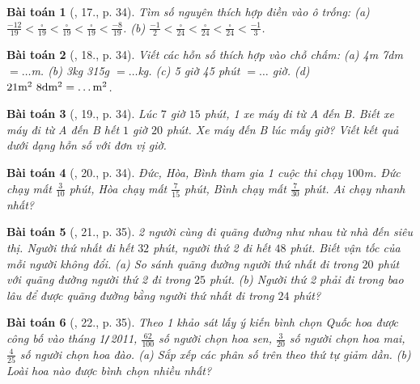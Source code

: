 \documentclass{article}
\newtheorem{baitoan}{Bài toán}
\begin{document}
\begin{baitoan}[\cite{SBT_Toan_6_Canh_Dieu_tap_2}, 17., p. 34]
	Tìm số nguyên thích hợp điền vào ô trống: (a) $\frac{-12}{19} < \frac{\square}{19} < \frac{\square}{19} < \frac{\square}{19} < \frac{-8}{19}$. (b) $\frac{-1}{2} < \frac{\square}{24} < \frac{\square}{24} < \frac{\square}{24} < \frac{-1}{3}$.
\end{baitoan}

\begin{baitoan}[\cite{SBT_Toan_6_Canh_Dieu_tap_2}, 18., p. 34]
	Viết các hỗn số thích hợp vào chỗ chấm: (a) \emph{4m 7dm $=\ldots$m}. (b) \emph{3kg 315g $=\ldots$kg}. (c) \emph{5 giờ 45 phút $=\ldots$ giờ}. (d) $\rm21m^2\ 8dm^2 =\ldots m^2$.
\end{baitoan}

\begin{baitoan}[\cite{SBT_Toan_6_Canh_Dieu_tap_2}, 19., p. 34]
	Lúc $7$ giờ $15$ phút, 1 xe máy đi từ A đến B. Biết xe máy đi từ A đến B hết $1$ giờ $20$ phút. Xe máy đến B lúc mấy giờ? Viết kết quả dưới dạng hỗn số với đơn vị giờ.
\end{baitoan}

\begin{baitoan}[\cite{SBT_Toan_6_Canh_Dieu_tap_2}, 20., p. 34]
	Đức, Hòa, Bình tham gia 1 cuộc thi chạy $100$\emph{m}. Đức chạy mất $\frac{3}{10}$ phút, Hòa chạy mất $\frac{7}{15}$ phút, Bình chạy mất $\frac{7}{30}$ phút. Ai chạy nhanh nhất?
\end{baitoan}

\begin{baitoan}[\cite{SBT_Toan_6_Canh_Dieu_tap_2}, 21., p. 35]
	2 người cùng đi quãng đường như nhau từ nhà đến siêu thị. Người thứ nhất đi hết $32$ phút, người thứ 2 đi hết $48$ phút. Biết vận tốc của mỗi người không đổi. (a) So sánh quãng đường người thứ nhất đi trong $20$ phút với quãng đường người thứ 2 đi trong $25$ phút. (b) Người thứ 2 phải đi trong bao lâu để được quãng đường bằng người thứ nhất đi trong $24$ phút?
\end{baitoan}

\begin{baitoan}[\cite{SBT_Toan_6_Canh_Dieu_tap_2}, 22., p. 35]
	Theo 1 khảo sát lấy ý kiến bình chọn Quốc hoa được công bố vào tháng \emph{1\texttt{/}2011}, $\frac{62}{100}$ số người chọn hoa sen, $\frac{3}{20}$ số người chọn hoa mai, $\frac{4}{25}$ số người chọn hoa đào. (a) Sắp xếp các phân số trên theo thứ tự giảm dần. (b) Loài hoa nào được bình chọn nhiều nhất?
\end{baitoan}
\end{document}
